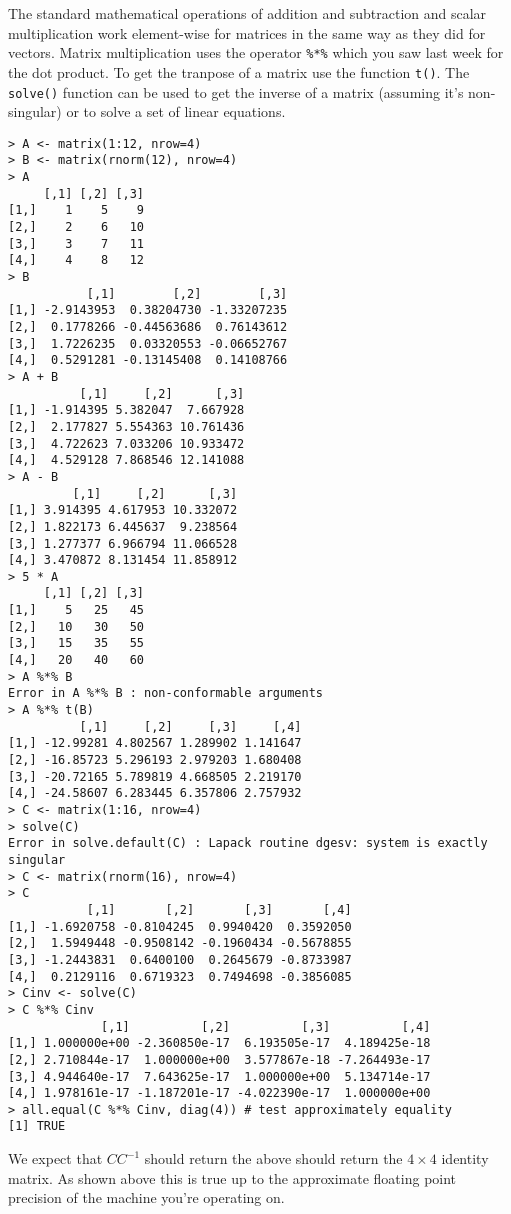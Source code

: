 The standard mathematical operations of addition and subtraction and
scalar multiplication work element-wise for matrices in the same way as
they did for vectors. Matrix multiplication uses the operator
\lstinline!%*%! which you saw last week for the dot product. To get the
tranpose of a matrix use the function \lstinline!t()!. The
\lstinline!solve()! function can be used to get the inverse of a matrix
(assuming it's non-singular) or to solve a set of linear equations.

\begin{lstlisting}
> A <- matrix(1:12, nrow=4)
> B <- matrix(rnorm(12), nrow=4)
> A
     [,1] [,2] [,3]
[1,]    1    5    9
[2,]    2    6   10
[3,]    3    7   11
[4,]    4    8   12
> B
           [,1]        [,2]        [,3]
[1,] -2.9143953  0.38204730 -1.33207235
[2,]  0.1778266 -0.44563686  0.76143612
[3,]  1.7226235  0.03320553 -0.06652767
[4,]  0.5291281 -0.13145408  0.14108766
> A + B
          [,1]     [,2]      [,3]
[1,] -1.914395 5.382047  7.667928
[2,]  2.177827 5.554363 10.761436
[3,]  4.722623 7.033206 10.933472
[4,]  4.529128 7.868546 12.141088
> A - B
         [,1]     [,2]      [,3]
[1,] 3.914395 4.617953 10.332072
[2,] 1.822173 6.445637  9.238564
[3,] 1.277377 6.966794 11.066528
[4,] 3.470872 8.131454 11.858912
> 5 * A
     [,1] [,2] [,3]
[1,]    5   25   45
[2,]   10   30   50
[3,]   15   35   55
[4,]   20   40   60
> A %*% B
Error in A %*% B : non-conformable arguments
> A %*% t(B)
          [,1]     [,2]     [,3]     [,4]
[1,] -12.99281 4.802567 1.289902 1.141647
[2,] -16.85723 5.296193 2.979203 1.680408
[3,] -20.72165 5.789819 4.668505 2.219170
[4,] -24.58607 6.283445 6.357806 2.757932
> C <- matrix(1:16, nrow=4)
> solve(C)
Error in solve.default(C) : Lapack routine dgesv: system is exactly singular
> C <- matrix(rnorm(16), nrow=4)
> C
           [,1]       [,2]       [,3]       [,4]
[1,] -1.6920758 -0.8104245  0.9940420  0.3592050
[2,]  1.5949448 -0.9508142 -0.1960434 -0.5678855
[3,] -1.2443831  0.6400100  0.2645679 -0.8733987
[4,]  0.2129116  0.6719323  0.7494698 -0.3856085
> Cinv <- solve(C)
> C %*% Cinv
             [,1]          [,2]          [,3]          [,4]
[1,] 1.000000e+00 -2.360850e-17  6.193505e-17  4.189425e-18
[2,] 2.710844e-17  1.000000e+00  3.577867e-18 -7.264493e-17
[3,] 4.944640e-17  7.643625e-17  1.000000e+00  5.134714e-17
[4,] 1.978161e-17 -1.187201e-17 -4.022390e-17  1.000000e+00
> all.equal(C %*% Cinv, diag(4)) # test approximately equality 
[1] TRUE
\end{lstlisting}


We expect that $CC^{-1}$ should return the above should return the
$4 \times 4$ identity matrix. As shown above this is true up to the
approximate floating point precision of the machine you're operating on.

